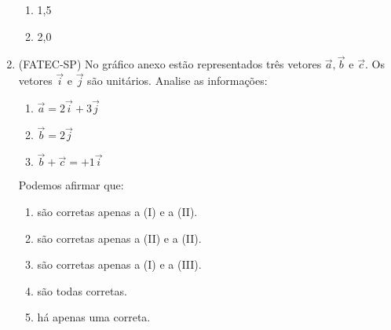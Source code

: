 \begin{enumerate}
\begin{enumerate}
\item {} 
1,5

\item {} 
2,0

\end{enumerate}

\item (FATEC-SP) No gráfico anexo estão representados três vetores \(\vec{a},\vec{b}\)  e  \(\vec{c}\). Os vetores \(\vec{i}\) e \(\vec{j}\) são unitários. Analise as informações:
\begin{enumerate}
\item {} 
\(\vec{a}=2\vec{i}+3\vec{j}\)

\item {} 
\(\vec{b}=2\vec{j}\)

\item {} 
\(\vec{b}+\vec{c}=+1\vec{i}\)

\end{enumerate}
\begin{quote}
\begin{center}\end{center}\end{quote}

Podemos afirmar que:
\begin{enumerate}
\item {} 
são corretas apenas a (I) e a (II).

\item {} 
são corretas apenas a (II) e a (II).

\item {} 
são corretas apenas a (I) e a (III).

\item {} 
são todas corretas.

\item {} 
há apenas uma correta.

\end{enumerate}
\end{enumerate}



